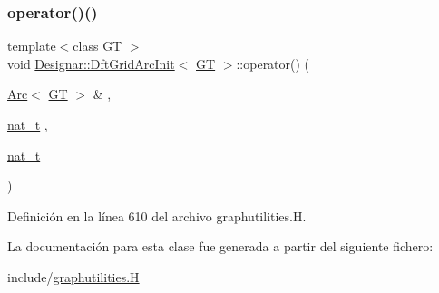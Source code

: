 \subsubsection{\texorpdfstring{operator()()}{operator()()}}
{\footnotesize\ttfamily template$<$class GT $>$ \\
void \hyperlink{class_designar_1_1_dft_grid_arc_init}{Designar\+::\+Dft\+Grid\+Arc\+Init}$<$ \hyperlink{demo-buildgraph_8_c_a3001c40d2c31ca87ed96cd7d1334a55e}{GT} $>$\+::operator() (\begin{DoxyParamCaption}\item[{\hyperlink{namespace_designar_a3f55fb5513d62ff47cbc8f72b8e95d6f}{Arc}$<$ \hyperlink{demo-buildgraph_8_c_a3001c40d2c31ca87ed96cd7d1334a55e}{GT} $>$ \&}]{,  }\item[{\hyperlink{namespace_designar_aa72662848b9f4815e7bf31a7cf3e33d1}{nat\+\_\+t}}]{,  }\item[{\hyperlink{namespace_designar_aa72662848b9f4815e7bf31a7cf3e33d1}{nat\+\_\+t}}]{ }\end{DoxyParamCaption})\hspace{0.3cm}{\ttfamily [inline]}}



Definición en la línea 610 del archivo graphutilities.\+H.



La documentación para esta clase fue generada a partir del siguiente fichero\+:\begin{DoxyCompactItemize}
\item 
include/\hyperlink{graphutilities_8_h}{graphutilities.\+H}\end{DoxyCompactItemize}
